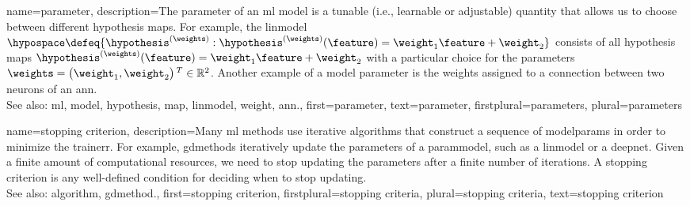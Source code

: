 {name={parameter},
	description={The parameter of an \gls{ml} \gls{model} is a tunable (i.e., learnable or adjustable) quantity that 
		allows us to choose between different \gls{hypothesis} \glspl{map}. For example, the \gls{linmodel} 
		$\hypospace \defeq \{\hypothesis^{(\weights)}: \hypothesis^{(\weights)}(\feature)= \weight_{1} \feature + \weight_{2}\}$ 
		consists of all \gls{hypothesis} \glspl{map} $\hypothesis^{(\weights)}(\feature)= \weight_{1} \feature + \weight_{2}$ 
		with a particular choice for the parameters $\weights = \big(\weight_{1},\weight_{2}\big)\,^{T} \in \mathbb{R}^{2}$. 
		Another example of a \gls{model} parameter is the \glspl{weight} assigned to a connection between two \glspl{neuron} of an \gls{ann}.
				\\
		See also: \gls{ml}, \gls{model}, \gls{hypothesis}, \gls{map}, \gls{linmodel}, \gls{weight}, \gls{ann}.},
	first={parameter},
	text={parameter},
	firstplural={parameters}, 
 	plural={parameters}
}
    
{name={stopping criterion},
	description={Many \gls{ml} methods use iterative \glspl{algorithm} 
		that construct a sequence of \glspl{modelparam} in order to minimize the \gls{trainerr}. 
		For example, \glspl{gdmethod} iteratively update the \glspl{parameter} of a \gls{parammodel}, 
		such as a \gls{linmodel} or a \gls{deepnet}. Given a finite amount of computational 
		resources, we need to stop updating the \glspl{parameter} after a finite number of \glspl{iteration}. 
		A stopping criterion is any well-defined condition for deciding when to stop updating.
				\\
		See also: \gls{algorithm}, \gls{gdmethod}.},
	first={stopping criterion},
	firstplural={stopping criteria},
	plural={stopping criteria}, 
	text={stopping criterion}
}

